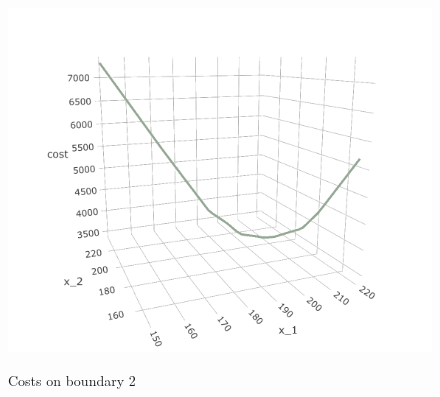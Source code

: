 \documentclass[a4paper,11pt]{article}
\begin{document}
\begin{figure}[ht]
\centering
\caption{Costs on boundary 2}
\includegraphics[width=\textwidth]{Example-figure_files/figure-latex/boundary2.png}
\label{fig:bd2}
\end{figure}
\end{document}
